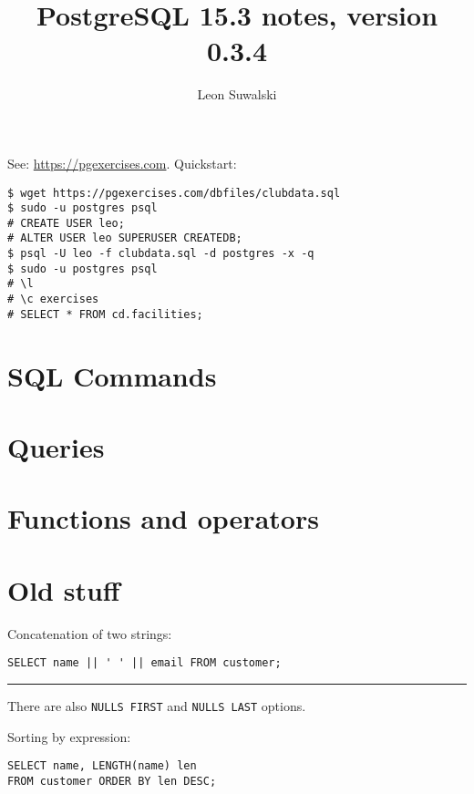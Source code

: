 \documentclass{charun}
\title{PostgreSQL 15.3 notes, version 0.3.4}
\author{Leon Suwalski}
\begin{document}
\begin{multicols*}{2}
\maketitle
\raggedright

See: \url{https://pgexercises.com}.
Quickstart:
\begin{verbatim}
$ wget https://pgexercises.com/dbfiles/clubdata.sql
$ sudo -u postgres psql
# CREATE USER leo;
# ALTER USER leo SUPERUSER CREATEDB;
$ psql -U leo -f clubdata.sql -d postgres -x -q
$ sudo -u postgres psql
# \l
# \c exercises
# SELECT * FROM cd.facilities;
\end{verbatim}

\section{SQL Commands}


\section{Queries}


\section{Functions and operators}








\newpage
\section{Old stuff}
Concatenation of two strings:
\begin{verbatim}
SELECT name || ' ' || email FROM customer;
\end{verbatim}

\hrule

There are also \texttt{NULLS FIRST} and \texttt{NULLS LAST} options.

Sorting by expression:
\begin{verbatim}
SELECT name, LENGTH(name) len
FROM customer ORDER BY len DESC;
\end{verbatim}


\end{multicols*}
\end{document}

